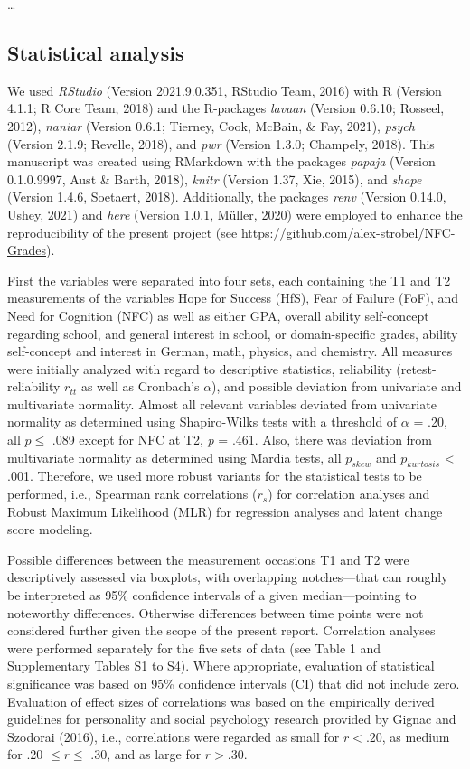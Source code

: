 \documentclass[
  man]{apa6}
\begin{document}
\ldots{}

\hypertarget{statistical-analysis}{%
\subsection{Statistical analysis}\label{statistical-analysis}}

We used \emph{RStudio} (Version 2021.9.0.351, RStudio Team, 2016) with R (Version 4.1.1; R Core Team, 2018) and the R-packages \emph{lavaan} (Version 0.6.10; Rosseel, 2012), \emph{naniar} (Version 0.6.1; Tierney, Cook, McBain, \& Fay, 2021), \emph{psych} (Version 2.1.9; Revelle, 2018), and \emph{pwr} (Version 1.3.0; Champely, 2018). This manuscript was created using RMarkdown with the packages \emph{papaja} (Version 0.1.0.9997, Aust \& Barth, 2018), \emph{knitr} (Version 1.37, Xie, 2015), and \emph{shape} (Version 1.4.6, Soetaert, 2018). Additionally, the packages \emph{renv} (Version 0.14.0, Ushey, 2021) and \emph{here} (Version 1.0.1, Müller, 2020) were employed to enhance the reproducibility of the present project (see \url{https://github.com/alex-strobel/NFC-Grades}).

First the variables were separated into four sets, each containing the T1 and T2 measurements of the variables Hope for Success (HfS), Fear of Failure (FoF), and Need for Cognition (NFC) as well as either GPA, overall ability self-concept regarding school, and general interest in school, or domain-specific grades, ability self-concept and interest in German, math, physics, and chemistry. All measures were initially analyzed with regard to descriptive statistics, reliability (retest-reliability \(r_{tt}\) as well as Cronbach's \(\alpha\)), and possible deviation from univariate and multivariate normality. Almost all relevant variables deviated from univariate normality as determined using Shapiro-Wilks tests with a threshold of \(\alpha\) = .20, all \(p\le\) .089 except for NFC at T2, \emph{p} = .461. Also, there was deviation from multivariate normality as determined using Mardia tests, all \(p_{skew}\) and \(p_{kurtosis}\) \textless{} .001. Therefore, we used more robust variants for the statistical tests to be performed, i.e., Spearman rank correlations (\(r_s\)) for correlation analyses and Robust Maximum Likelihood (MLR) for regression analyses and latent change score modeling.

Possible differences between the measurement occasions T1 and T2 were descriptively assessed via boxplots, with overlapping notches---that can roughly be interpreted as 95\% confidence intervals of a given median---pointing to noteworthy differences. Otherwise differences between time points were not considered further given the scope of the present report. Correlation analyses were performed separately for the five sets of data (see Table 1 and Supplementary Tables S1 to S4). Where appropriate, evaluation of statistical significance was based on 95\% confidence intervals (CI) that did not include zero. Evaluation of effect sizes of correlations was based on the empirically derived guidelines for personality and social psychology research provided by Gignac and Szodorai (2016), i.e., correlations were regarded as small for \(r < .20\), as medium for .20 \(\le r \le\) .30, and as large for \(r > .30\).
\end{document}
